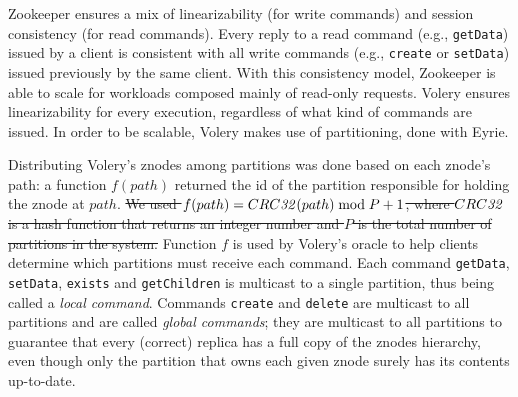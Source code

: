 \documentclass[10pt, conference, compsocconf, letterpaper]{IEEEtranv17}
\providecommand{\DIFdel}[1]{{\protect\color{red}\sout{#1}}}                      %
\providecommand{\DIFdelbegin}{} %
\providecommand{\DIFdelend}{} %
\begin{document}
Zookeeper ensures a mix of linearizability (for write commands) and session consistency (for read commands).
Every reply to a read command (e.g., \verb#getData#) issued by a client is consistent with all write commands (e.g., \verb#create# or \verb#setData#) issued previously by the same client. 
With this consistency model, Zookeeper is able to scale for workloads composed mainly of read-only requests. 
Volery ensures linearizability for every execution, regardless of what kind of commands are issued. 
In order to be scalable, Volery makes use of partitioning, done with Eyrie.

Distributing Volery's znodes among partitions was done based on each znode's path: a function $f(path)$ returned the id of the partition responsible for holding the znode at $path$. 
\DIFdelbegin \DIFdel{We used \mbox{$f(path) = CRC\text{\textit{32}}(path) \bmod P + 1$}, where $CRC\text{\textit{32}}$ is a hash function that returns an integer number and $P$ is the total number of partitions in the system. 
}\DIFdelend %
Function $f$ is used by Volery's oracle to help clients determine which partitions must receive each command. 
Each command \verb#getData#, \verb#setData#, \verb#exists# and \verb#getChildren# is multicast to a single partition, thus being called a \emph{local command}. Commands \verb#create# and \verb#delete# are multicast to all partitions and are called \emph{global commands}; they are multicast to all partitions to guarantee that every (correct) replica has a full copy of the znodes hierarchy, even though only the partition that owns each given znode surely has its contents up-to-date. 
\end{document}
